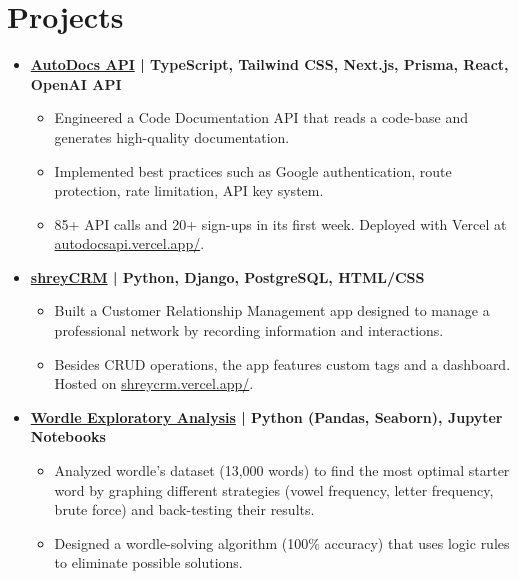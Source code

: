 \documentclass[letterpaper,12pt]{article}
\newcommand{\resumeItem}[2]{
  \item\small{
    \textbf{#1}{ #2 \vspace{-2pt}}
  }
}
\newcommand{\resumeSubItem}[2]{\resumeItem{#1}{#2}\vspace{-2pt}}
\newcommand{\resumeSubHeadingListStart}{\begin{itemize}[leftmargin=*]}
\newcommand{\resumeSubHeadingListEnd}{\end{itemize}}
\begin{document}
\section{Projects}
\resumeSubHeadingListStart
  \resumeSubItem{\href{https://github.com/ShreyanshMisra/autodocs}{AutoDocs API} {\footnotesize \normalfont| TypeScript, Tailwind CSS, Next.js, Prisma, React, OpenAI API}}{\vspace{-3pt}\begin{itemize}[label=\textopenbullet, leftmargin=*, itemsep=1pt]
    \item {Engineered a Code Documentation API that reads a code-base and generates high-quality documentation.}
    \item {Implemented best practices such as Google authentication, route protection, rate limitation, API key system.}
    \item {85+ API calls and 20+ sign-ups in its first week. Deployed with Vercel at \href{https://autodocsapi.vercel.app/}{autodocsapi.vercel.app/}.
}
    \end{itemize}
  }
  \resumeSubItem{\href{https://github.com/ShreyanshMisra/shreyCRM}{shreyCRM} {\footnotesize \normalfont| Python, Django, PostgreSQL, HTML/CSS}}{\vspace{-3pt}\begin{itemize}[label=\textopenbullet, leftmargin=*, itemsep=1pt]
    \item {Built a Customer Relationship Management app designed to manage a professional network by recording information and interactions.}
    \item {Besides CRUD operations, the app features custom tags and a dashboard. Hosted on \href{https://shreycrm.vercel.app/}{shreycrm.vercel.app/}.}
    \end{itemize}
  }
  \resumeSubItem{\href{https://github.com/ShreyanshMisra/wordle}{Wordle Exploratory Analysis} {\footnotesize \normalfont| Python (Pandas, Seaborn), Jupyter Notebooks}}{\vspace{-3pt}\begin{itemize}[label=\textopenbullet, leftmargin=*, itemsep=1pt]
    \item {Analyzed wordle’s dataset (13,000 words) to find the most optimal starter word by graphing different strategies
(vowel frequency, letter frequency, brute force) and back-testing their results.}
    \item {Designed a wordle-solving algorithm (100\% accuracy) that uses logic rules to eliminate possible solutions.}
    \end{itemize}
  }
\resumeSubHeadingListEnd
\end{document}
